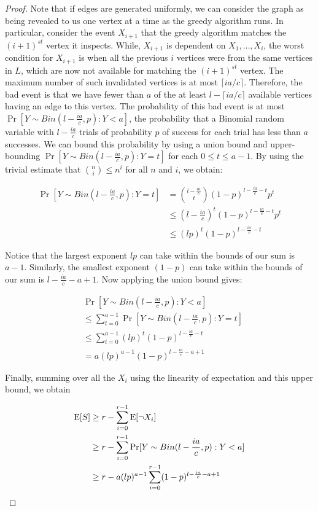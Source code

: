 \begin{proof}
Note that if edges are generated uniformly, we can consider the
graph as being revealed to us one vertex at a time as the greedy
algorithm runs. In particular, consider the event $X_{i+1}$ that the
greedy algorithm matches the $(i+1)^{st}$ vertex it inspects. While,
$X_{i+1}$ is dependent on $X_1,\ldots, X_i$, the worst condition for
$X_{i+1}$ is when all the previous $i$ vertices were from the same
vertices in $L$, which are now not available for matching the
$(i+1)^{st}$ vertex. The maximum number of such invalidated vertices
is at most $\lceil ia/c \rceil$. Therefore, the bad event
is that we have fewer than $a$ of the at least $l-\lceil ia/c \rceil$
available vertices having an edge to this vertex. The probability of this
bad event is at most $\Pr[Y\sim Bin(l-\frac{ia}{c},p): Y < a]$, the
probability that a Binomial random variable with $l - \frac{ia}{c}$
trials of probability $p$ of success for each trial has less than $a$
successes. We can bound this probability by using a union bound and
upper-bounding $\Pr[Y\sim Bin(l-\frac{ia}{c},p): Y = t]$ for each
$0 \leq t \leq a-1$. By using the trivial estimate that
$\binom{n}{i} \leq n^i$ for all $n$ and $i$, we obtain:

\begin{align*}
      \Pr[Y\sim Bin(l-\frac{ia}{c},p): Y = t]
&=    \binom{l-\frac{ia}{c}}{t} (1-p)^{l-\frac{ia}{c}-t}p^{t} \\
&\leq \left(l-\frac{ia}{c}\right)^t (1-p)^{l-\frac{ia}{c}-t} p^{t} \\
&\leq (lp)^t (1-p)^{l-\frac{ia}{c}-t}
\end{align*}

Notice that the largest exponent $lp$ can take within the bounds of
our sum is $a-1$. Similarly, the smallest exponent $(1-p)$ can take
within the bounds of our sum is $l-\frac{ia}{c}-a+1$. Now applying
the union bound gives:

\begin{align*}
&           \Pr[Y\sim Bin(l-\frac{ia}{c},p): Y < a] \\
&\leq  \sum_{t=0}^{a-1} \Pr[Y\sim Bin(l-\frac{ia}{c},p): Y = t] \\
&\leq  \sum_{t=0}^{a-1} (lp)^t (1-p)^{l-\frac{ia}{c}-t} \\
&=     a(lp)^{a-1} (1-p)^{l-\frac{ia}{c}-a+1}
\end{align*}

Finally, summing over all the $X_i$ using the linearity of
expectation and this upper bound, we obtain

\begin{align*}
      \text{E}[S]
&\geq r - \sum_{i=0}^{r-1} \text{E}[\lnot X_i] \\
&\geq r - \sum_{i=0}^{r-1} \Pr[Y \sim Bin(l-\frac{ia}{c},p): Y < a] \\
&\geq r - a(lp)^{a-1}\sum_{i=0}^{r-1}(1-p)^{l-\frac{ia}{c}-a+1}
\end{align*}
\end{proof}

